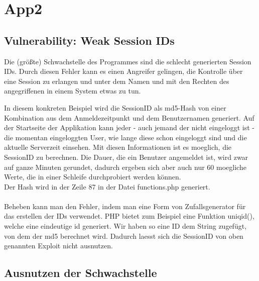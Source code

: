 \section{App2}

\subsection{Vulnerability: Weak Session IDs}

Die (größte) Schwachstelle des Programmes sind die schlecht generierten Session IDs. Durch diesen Fehler kann es einen Angreifer gelingen, die Kontrolle über eine Session zu erlangen und unter dem Namen und mit den Rechten des angegriffenen in einem System etwas zu tun.

In diesem konkreten Beispiel wird die SessionID als md5-Hash von einer Kombination aus dem Anmeldezeitpunkt und dem Benutzernamen generiert. Auf der Startseite der Applikation kann jeder - auch jemand der nicht eingeloggt ist - die momentan eingeloggten User, wie lange diese schon eingeloggt sind und die aktuelle Serverzeit einsehen. Mit diesen Informationen ist es moeglich, die SessionID zu berechnen. Die Dauer, die ein Benutzer angemeldet ist, wird zwar auf ganze Minuten gerundet, dadurch ergeben sich aber auch nur 60 moegliche Werte, die in einer Schleife durchprobiert werden können.\\
Der Hash wird in der Zeile 87 in der Datei functions.php generiert.\\\\
Beheben kann man den Fehler, indem man eine Form von Zufallsgenerator für das erstellen der IDs verwendet. PHP bietet zum Beispiel eine Funktion uniqid(), welche eine eindeutige id generiert. Wir haben so eine ID dem String zugefügt, von dem der md5 berechnet wird. Dadurch laesst sich die SessionID von oben genannten Exploit nicht ausnutzen.

\subsection{Ausnutzen der Schwachstelle}

